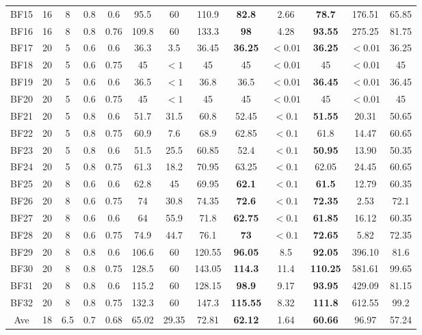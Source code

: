 \documentclass[review,3p,times,authoryear,12pt]{elsarticle}
\begin{document}
\begin{table}[htbp]
\begin{tabular}{c|c|c|c|c|c|c|c|c|c|c|c|c}
    BF15& 16 & 8  & 0.8 & 0.6  & 95.5  & 60    & 110.9  & \textbf{82.8} & 2.66    & \textbf{78.7}  & 176.51  & 65.85\\
    BF16& 16 & 8  & 0.8 & 0.76 & 109.8 & 60    & 133.3  & \textbf{98}   & 4.28    & \textbf{93.55} & 275.25  & 81.75\\
    BF17& 20 & 5  & 0.6 & 0.6  & 36.3  & 3.5   & 36.45  & \textbf{36.25}& $<0.01$ & \textbf{36.25} & $<0.01$ & 36.25\\
    BF18& 20 & 5  & 0.6 & 0.75 & 45    & $<1$  & 45     & 45            & $<0.01$ & 45             & $<0.01$ & 45\\
    BF19& 20 & 5  & 0.6 & 0.6  & 36.5  & $<1$  & 36.8   & 36.5          & $<0.01$ & \textbf{36.45} & $<0.01$ & 36.45\\
    BF20& 20 & 5  & 0.6 & 0.75 & 45    & $<1$  & 45     & 45            & $<0.01$ & 45             & $<0.01$ & 45\\
    BF21& 20 & 5  & 0.8 & 0.6  & 51.7  & 31.5  & 60.8   & 52.45         & $<0.1$  & \textbf{51.55} & 20.31   & 50.65\\
    BF22& 20 & 5  & 0.8 & 0.75 & 60.9  & 7.6   & 68.9   & 62.85         & $<0.1$  & 61.8           & 14.47   & 60.65\\
    BF23& 20 & 5  & 0.8 & 0.6  & 51.5  & 25.5  & 60.85  & 52.4          & $<0.1$  & \textbf{50.95} & 13.90   & 50.35\\
    BF24& 20 & 5  & 0.8 & 0.75 & 61.3  & 18.2  & 70.95  & 63.25         & $<0.1$  & 62.05          & 24.45   & 60.65\\
    BF25& 20 & 8  & 0.6 & 0.6  & 62.8  & 45    & 69.95  & \textbf{62.1} & $<0.1$  & \textbf{61.5}  & 12.79   & 60.35\\
    BF26& 20 & 8  & 0.6 & 0.75 & 74    & 30.8  & 74.35  & \textbf{72.6} & $<0.1$  & \textbf{72.35} & 2.53    & 72.1\\
    BF27& 20 & 8  & 0.6 & 0.6  & 64    & 55.9  & 71.8   & \textbf{62.75}& $<0.1$  & \textbf{61.85} & 16.12   & 60.35\\
    BF28& 20 & 8  & 0.6 & 0.75 & 74.9  & 44.7  & 76.1   & \textbf{73}   & $<0.1$  & \textbf{72.65} & 5.82    & 72.35\\
    BF29& 20 & 8  & 0.8 & 0.6  & 106.6 & 60    & 120.55 & \textbf{96.05}& 8.5     & \textbf{92.05} & 396.10  & 81.6\\
    BF30& 20 & 8  & 0.8 & 0.75 & 128.5 & 60    & 143.05 &\textbf{ 114.3}& 11.4    & \textbf{110.25}& 581.61  & 99.65\\
    BF31& 20 & 8  & 0.8 & 0.6  & 115.2 & 60    & 128.15 & \textbf{98.9} & 9.17    & \textbf{93.95} & 429.09  & 81.15\\
    BF32& 20 & 8  & 0.8 & 0.75 & 132.3 & 60    & 147.3  & \textbf{115.55}& 8.32   & \textbf{111.8} & 612.55  & 99.2\\
    \hline
    Ave & 18 & 6.5& 0.7 & 0.68 & 65.02 & 29.35 & 72.81  & \textbf{62.12}& 1.64    & \textbf{60.66} & 96.97   & 57.24\\
   \hline
\end{tabular}
\end{table}
\end{document}
